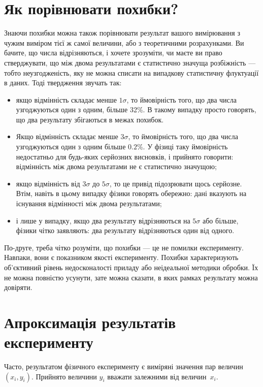 \documentclass{LabBook}
\begin{document}
  \chapter{Як порівнювати похибки?}


  Знаючи похибки можна також порівнювати результат вашого вимірювання з чужим виміром тієї ж самої величини, або з теоретичними розрахунками. Ви бачите, що числа відрізняються, і хочете зрозуміти, чи маєте ви право стверджувати, що між двома результатами є статистично значуща розбіжність --- тобто неузгодженість, яку не можна списати на випадкову статистичну флуктуації в даних. Тоді твердження звучать так:

  \begin{itemize}
    \item якщо відмінність складає менше $1\sigma$, то ймовірність того, що два числа узгоджуються один з одним, більше 32\%. В такому випадку просто говорять, що два результату збігаються в межах похибок.
    \item Якщо відмінність складає менше $3\sigma$, то ймовірність того, що два числа узгоджуються один з одним більше $0.2$\%. У фізиці таку ймовірність недостатньо для будь-яких серйозних висновків, і прийнято говорити: відмінність між двома результатами не є статистично значущою;
    \item якщо відмінність від $3\sigma$ до $5\sigma$, то це привід підозрювати щось серйозне. Втім, навіть в цьому випадку фізики говорять обережно: дані вказують на існування відмінності між двома результатами;
    \item і лише у випадку, якщо два результату відрізняються на $5\sigma$ або більше, фізики чітко заявляють: два результату відрізняються один від одного.
  \end{itemize}

  По-друге, треба чітко розуміти, що похибки --- це не помилки експерименту. Навпаки, вони є показником якості експерименту. Похибки характеризують об'єктивний рівень недосконалості приладу або неідеальної методики обробки. Їх не можна повністю усунути, зате можна сказати, в яких рамках результату можна довіряти.


  \chapter{Апроксимація результатів експерименту}


  Часто, результатом фізичного експерименту є виміряні значення пар величин $(x_i, y_i)$. Прийнято величини $y_i$ вважати залежними від величин~$x_i$.
\end{document}

